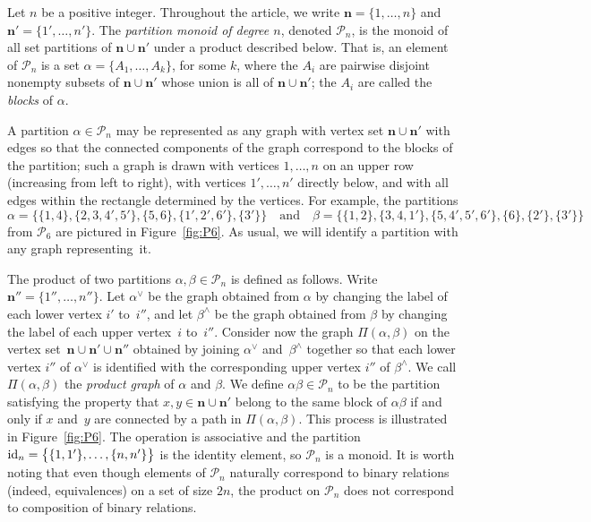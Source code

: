 \documentclass[11pt,a4paper]{article}
\renewcommand{\P}{\mathcal P}
\newcommand{\bn}{\mathbf{n}}
\newcommand{\al}{\alpha}
\newcommand{\be}{\beta}
\newcommand{\1}{\id_n}
\newcommand{\ANd}{\quad\text{and}\quad}
\numberwithin{equation}{section}
\theoremstyle{definition}
\begin{document}
Let $n$ be a positive integer.  Throughout the article, we write
$\bn=\{1,\ldots,n\}$ and $\bn'=\{1',\ldots,n'\}$.  The \emph{partition monoid
of degree $n$}, denoted $\P_n$, is the monoid of all set partitions of
$\bn\cup\bn'$ under a product described below.  That is, an element of $\P_n$
is a set $\al=\{A_1,\ldots,A_k\}$, for some $k$, where the $A_i$ are pairwise
disjoint nonempty subsets of $\bn\cup\bn'$ whose union is all of $\bn\cup\bn'$;
the $A_i$ are called the \emph{blocks} of $\al$.  

A partition $\al\in\P_n$ may be represented as any graph with vertex set
$\bn\cup\bn'$ with edges so that the connected components of the
graph correspond to the blocks of the partition; such a graph is drawn with
vertices $1,\ldots,n$ on an upper row (increasing from left to right), with
vertices $1',\ldots,n'$ directly below, and with all edges within the rectangle
determined by the vertices.   For example, the partitions
\[
\al = \big\{ \{1,4\},\{2,3,4',5'\},\{5,6\},\{1',2',6'\},\{3'\}\big\} \ANd
\be = \big\{ \{1,2\}, \{3,4,1'\}, \{5,4',5',6'\}, \{6\}, \{2'\}, \{3'\} \big\}
\]
from $\P_6$ are pictured in Figure~\ref{fig:P6}.  As usual, we will identify a
partition with any graph representing~it.

The product of two partitions $\al,\be\in\P_n$ is defined as follows.  Write
$\bn''=\{1'',\ldots,n''\}$.  Let $\al^\vee$ be the graph obtained from $\al$ by
changing the label of each lower vertex $i'$ to~$i''$, and let $\be^\wedge$ be
the graph obtained from $\be$ by changing the label of each upper vertex~$i$
to~$i''$.  Consider now the graph $\Pi(\al,\be)$ on the vertex set~$\bn\cup
\bn'\cup \bn''$ obtained by joining $\al^\vee$ and~$\be^\wedge$ together so
that each lower vertex $i''$ of $\al^\vee$ is identified with the corresponding
upper vertex $i''$ of $\be^\wedge$.  We call $\Pi(\al,\be)$ the \emph{product
graph} of $\al$ and $\be$.  We define $\al\be\in\P_n$ to be the partition
satisfying the property that $x,y\in\bn\cup\bn'$ belong to the same block of
$\al\be$ if and only if $x$ and~$y$ are connected by a path in $\Pi(\al,\be)$.
This process is illustrated in Figure~\ref{fig:P6}.  
%
The operation is associative and the partition
$\1=\big\{\{1,1'\},\ldots,\{n,n'\}\big\}$ is the identity element, so $\P_n$ is
a monoid. 
%
It is worth noting that even though elements of $\P_n$ naturally correspond to binary relations (indeed, equivalences) on a set of size $2n$, the product on $\P_n$ does not correspond to composition of binary relations.
\end{document}
